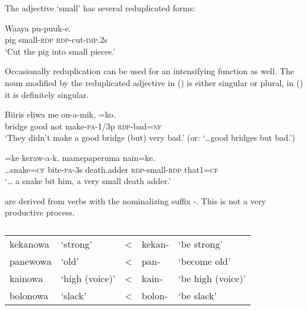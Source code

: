 The adjective  `small' has several reduplicated forms: \textstyleEmphasizedVernacularWords{,} \textstyleEmphasizedVernacularWords{,}  

\ea%
\label{ex:x486}
\gll Waaya  pu-puuk-e. \\
pig small-\textsc{rdp} \textsc{rdp}-cut-\textsc{imp}.2s\\
\glt`Cut the pig into small pieces.'
\z

Occasionally reduplication can be used for an intensifying function as well. The noun modified by the reduplicated adjective in () is either singular or plural, in () it is definitely singular.

\ea%
\label{ex:x485}
\gll Biiris eliwa me on-a-mik, =ko. \\
bridge good not make-\textsc{pa}-1/3p \textsc{rdp}-bad=\textsc{nf}\\
\glt`They didn't make a good bridge (but) very bad.' (or: `{\dots}good bridges but bad.')
\z

\ea%
\label{ex:x86}
=ke keraw-a-k, mamepaperuma  nain=ke. \\
{\dots}snake=\textsc{cf} bite-\textsc{pa}-3s death.adder \textsc{rdp}-small-\textsc{rdp} that1=\textsc{cf}\\
\glt`{\dots} a snake bit him, a very small death adder.'
\z

 are derived from verbs with the nominalizing suffix \nobreakdash-. This is not a very productive process.

\begin{table}
\caption{}
\label{} 
\begin{tabular}{llcll}
kekanowa &`strong' &{{\textless}} &kekan- &`be strong'\\
panewowa &`old' &{{\textless}} &pan- &`become old'\\
kainowa &`high (voice)' &{{\textless}} &kain- &`be high (voice)'\\
bolonowa &`slack' &{{\textless}} &bolon- &`be slack'\\
\end{tabular}
\end{table}


